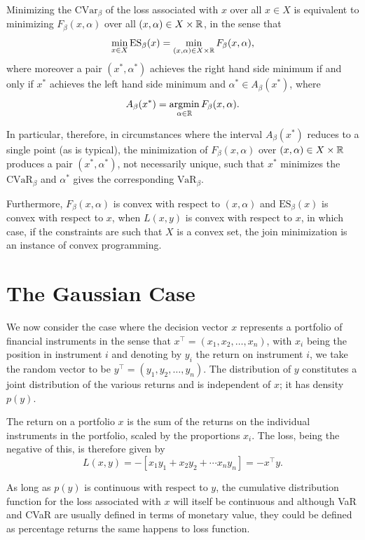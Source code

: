 \begin{theorem}
	Minimizing the $\mbox{CVar}_\beta$ of the loss associated with $x$ over all $x\in X$ is equivalent to minimizing $F_\beta(x,\alpha)$ over all $(x,\alpha)\in X\times \mathbb{R}$, in the sense that
	\[
		\min_{x\in X}{\mbox{ES}_\beta(x)} = \min_{(x,\alpha)\in X\times \mathbb{R}}{F_\beta(x,\alpha)},
	\]
	where moreover a pair $(x^*, \alpha^*)$ achieves the right hand side minimum if and only if $x^*$ achieves the left hand side minimum and $\alpha^*\in A_\beta(x^*)$, where
	\[
		A_\beta(x^*) = \operatorname*{argmin}_{\alpha\in \mathbb{R}}{F_\beta(x,\alpha)}.
	\]

	In particular, therefore, in circumstances where the interval $A_\beta(x^*)$ reduces to a single point (as is typical), the minimization of $F_\beta(x,\alpha)$ over $(x,\alpha)\in X\times \mathbb{R}$ produces a pair $(x^*, \alpha^*)$, not necessarily unique, such that $x^*$ minimizes the $\mbox{CVaR}_\beta$ and $\alpha^*$ gives the corresponding $\mbox{VaR}_\beta$.

	Furthermore, $F_\beta(x,\alpha)$ is convex with respect to $(x,\alpha)$ and $\mbox{ES}_\beta(x)$ is convex with respect to $x$, when $L(x,y)$ is convex with respect to $x$, in which case, if the constraints are such that $X$ is a convex set, the join minimization is an instance of convex programming.

\end{theorem}

\section{The Gaussian Case}

We now consider the case where the decision vector $x$ represents a portfolio of financial instruments in the sense that $x^\top = (x_1, x_2, \dots, x_n)$, with $x_i$ being the position in instrument $i$ and denoting by $y_i$ the return on instrument $i$, we take the random vector to be $y^\top=(y_1, y_2, \dots, y_n)$. The distribution of $y$ constitutes a joint distribution of the various returns and is independent of $x$; it has density $p(y)$.

The return on a portfolio $x$ is the sum of the returns on the individual instruments in the portfolio, scaled by the proportions $x_i$. The loss, being the negative of this, is therefore given by
\[
	L(x,y) = -[x_1y_1+x_2y_2+\cdots x_ny_n] = -x^\top y.
\]

As long as $p(y)$ is continuous with respect to $y$, the cumulative distribution function for the loss associated with $x$ will itself be continuous and although VaR and CVaR are usually defined in terms of monetary value, they could be defined as percentage returns the same happens to loss function.

